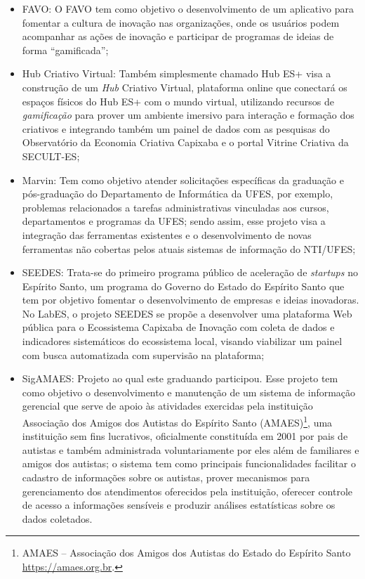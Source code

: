 \begin{itemize}
	\item FAVO: O FAVO tem como objetivo o desenvolvimento de um aplicativo para fomentar a cultura de inovação nas organizações, onde os usuários podem acompanhar as ações de inovação e participar de programas de ideias de forma ``gamificada'';
	
	\item Hub Criativo Virtual: Também simplesmente chamado Hub ES+ visa a construção de um \textit{Hub} Criativo Virtual, plataforma online que conectará os espaços físicos do Hub ES+ com o mundo virtual, utilizando recursos de \textit{gamificação} para prover um ambiente imersivo para interação e formação dos criativos e integrando também um painel de dados com as pesquisas do Observatório da Economia Criativa Capixaba e o portal Vitrine Criativa da SECULT-ES;
	
	\item Marvin: Tem como objetivo atender solicitações específicas da graduação e pós-graduação do Departamento de Informática da UFES, por exemplo, problemas relacionados a tarefas administrativas vinculadas aos cursos, departamentos e programas da UFES; sendo assim, esse projeto visa a integração das ferramentas existentes e o desenvolvimento de novas ferramentas não cobertas pelos atuais sistemas de informação do NTI/UFES;
	
	\item SEEDES: Trata-se do primeiro programa público de aceleração de \textit{startups} no Espírito Santo, um programa do Governo do Estado do Espírito Santo que tem por objetivo fomentar o desenvolvimento de empresas e ideias inovadoras. No LabES, o projeto SEEDES se propõe a desenvolver uma plataforma Web pública para o Ecossistema Capixaba de Inovação com coleta de dados e indicadores sistemáticos do ecossistema local, visando viabilizar um painel com busca automatizada com supervisão na plataforma;
	
	\item SigAMAES: Projeto ao qual este graduando participou. Esse projeto tem como objetivo o desenvolvimento e manutenção de um sistema de informação gerencial que serve de apoio às atividades exercidas pela instituição Associação dos Amigos dos Autistas do Espírito Santo (AMAES)\footnote{AMAES – Associação dos Amigos dos Autistas do Estado do Espírito Santo \url{https://amaes.org.br}.}, uma instituição sem fins lucrativos, oficialmente constituída em 2001 por pais de autistas e também administrada voluntariamente por eles além de familiares e amigos dos autistas; o sistema tem como principais funcionalidades facilitar o cadastro de informações sobre os autistas, prover mecanismos para gerenciamento dos atendimentos oferecidos pela instituição, oferecer controle de acesso a informações sensíveis e produzir análises estatísticas sobre os dados coletados.
\end{itemize}
